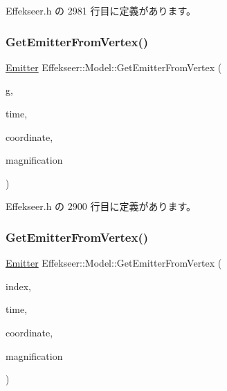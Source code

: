  Effekseer.\+h の 2981 行目に定義があります。

\mbox{\label{class_effekseer_1_1_model_a903c0b92208cebf971846956770fb681}} 
\subsubsection{\texorpdfstring{Get\+Emitter\+From\+Vertex()}{GetEmitterFromVertex()}\hspace{0.1cm}{\footnotesize\ttfamily [1/2]}}
{\footnotesize\ttfamily \mbox{\hyperlink{struct_effekseer_1_1_model_1_1_emitter}{Emitter}} Effekseer\+::\+Model\+::\+Get\+Emitter\+From\+Vertex (\begin{DoxyParamCaption}\item[{\mbox{\hyperlink{class_effekseer_1_1_i_rand_object}{I\+Rand\+Object}} $\ast$}]{g,  }\item[{int32\+\_\+t}]{time,  }\item[{\mbox{\hyperlink{namespace_effekseer_ac8508f8823c5fcf36aac5d2ddee23765}{Coordinate\+System}}}]{coordinate,  }\item[{float}]{magnification }\end{DoxyParamCaption})\hspace{0.3cm}{\ttfamily [inline]}}



 Effekseer.\+h の 2900 行目に定義があります。

\mbox{\label{class_effekseer_1_1_model_a0cdeb0635f63e2697bb82f74c8c40aef}} 
\subsubsection{\texorpdfstring{Get\+Emitter\+From\+Vertex()}{GetEmitterFromVertex()}\hspace{0.1cm}{\footnotesize\ttfamily [2/2]}}
{\footnotesize\ttfamily \mbox{\hyperlink{struct_effekseer_1_1_model_1_1_emitter}{Emitter}} Effekseer\+::\+Model\+::\+Get\+Emitter\+From\+Vertex (\begin{DoxyParamCaption}\item[{int32\+\_\+t}]{index,  }\item[{int32\+\_\+t}]{time,  }\item[{\mbox{\hyperlink{namespace_effekseer_ac8508f8823c5fcf36aac5d2ddee23765}{Coordinate\+System}}}]{coordinate,  }\item[{float}]{magnification }\end{DoxyParamCaption})\hspace{0.3cm}{\ttfamily [inline]}}




